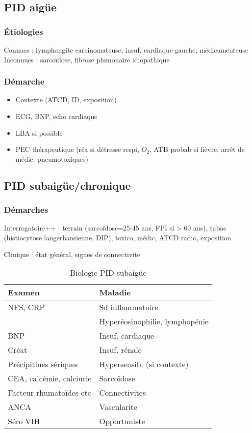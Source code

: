 \subsection{PID aigüe}
\subsubsection{Étiologies}
Connues : lymphangite carcinomateuse, insuf. cardiaque gauche, médicamenteuse\\
Inconnues : sarcoïdose, fibrose plumonaire idiopathique
\subsubsection{Démarche}
\begin{itemize}
\item Contexte (ATCD, ID, exposition)
\item ECG, BNP, echo cardiaque
\item LBA si possible
\item PEC thérapeutique (réa si détresse respi, \(O_2\), ATB probab si fièvre, arrêt de médic. pneumotoxiques)
\end{itemize}

\subsection{PID subaigüe/chronique}
\subsubsection{Démarches}
Interrogatoire++ : terrain (sarcoïdose=25-45 ans, FPI si > 60 ans), tabac (histiocytose langerhansienne, DIP), toxico, médic, ATCD radio, exposition

Clinique : état général, signes de connectivite


\begin{table}[htbp]
\caption{Biologie PID subaigüe}
\centering
\begin{tabular}{ll}
\toprule
Examen & Maladie\\
\midrule
NFS, CRP & Sd inflammatoire\\
 & Hyperéosinophilie, lymphopénie\\
BNP & Insuf. cardiaque\\
Créat & Insuf. rénale\\
Précipitines sériques & Hypersensib. (si contexte)\\
CEA, calcémie, calciurie & Sarcoïdose\\
Facteur rhumatoïdes etc & Connectivites\\
ANCA & Vascularite\\
Séro VIH & Opportuniste\\
\bottomrule
\end{tabular}
\end{table}

